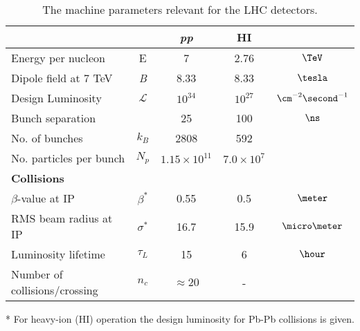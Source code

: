 \begin{table}[!htb]
  \centering
  \begin{threeparttable}
    \begin{tabular}{|lcccc|}
    \hline 
                                  &              &           \textit{pp} &         \textbf{HI} &  \\
    \hline
    Energy per nucleon            & E            &                     7 &                2.76 &                 $\TeV$ \\
    Dipole field at 7 TeV         & \textit{B}   &                  8.33 &                8.33 &               $\tesla$ \\
    Design Luminosity\tnote{*}    & $\mathcal{L}$ &            $10^{34}$ &           $10^{27}$ & $\cm^{-2}\second^{-1}$ \\
    Bunch separation              &              &                    25 &                 100 &                  $\ns$ \\
    No. of bunches                & $k_B$        &                  2808 &                 592 &                        \\
    No. particles per bunch       & $N_p$        & $1.15 \times 10^{11}$ & $7.0 \times 10^{7}$ &                        \\
    \hline
    \hline
    \textbf{Collisions}           &              &  &  &  \\
    \hline
    $\beta$-value at IP           & $\beta^{*}$  &                  0.55 &                 0.5 &        $\meter$ \\
    RMS beam radius at IP         & $\sigma^{*}$ &                  16.7 &                15.9 &  $\micro\meter$ \\
    Luminosity lifetime           & $\tau_L$     &                    15 &                   6 &         $\hour$ \\
    Number of collisions/crossing & $n_c$        &          $\approx 20$ &                   - &                 \\
    \hline
    \end{tabular}
    \begin{tablenotes}
      \item[*] For heavy-ion (HI) operation the design luminosity for Pb-Pb collisions is given.
    \end{tablenotes}
  \end{threeparttable}
  \caption[LHC parameters relevant for detectors]{The machine parameters relevant for the 
                                                  LHC detectors.\cite{CMSTDR:CMSPhysicsVol1}}
  \label{TABLE:ExperimentalApparatus_LHCMachineParameters}
\end{table}
